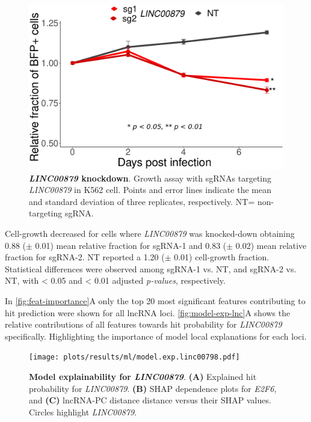 \begin{figure}[ht!]
  \centering
  \includegraphics[scale=0.29]{plots/results/ml/exp.val.results.pdf}
  \caption[\textit{LINC00879} knockdown]{\textbf{\textit{LINC00879} knockdown}. Growth assay with sgRNAs targeting \textit{LINC00879} in K562 cell. Points and error lines indicate the mean and standard deviation of three replicates, respectively. NT= non-targeting sgRNA.}
  \label{fig:linc-kd}
\end{figure}

Cell-growth decreased for cells where \textit{LINC00879} was knocked-down obtaining 0.88 ($\pm$ 0.01) mean relative fraction for sgRNA-1 and 0.83 ($\pm$ 0.02) mean relative fraction  for sgRNA-2. NT reported a 1.20 ($\pm$ 0.01) cell-growth fraction. Statistical differences were observed among sgRNA-1 vs. NT, and sgRNA-2 vs. NT, with < 0.05 and < 0.01 adjusted \textit{p-values}, respectively. 

In \autoref{fig:feat-importance}A only the top 20 most significant features contributing to hit prediction were shown for all lncRNA loci. \autoref{fig:model-exp-lnc}A shows the relative contributions of all features towards hit probability for \textit{LINC00879} specifically. Highlighting the importance of model local explanations for each loci.

\begin{figure}[ht!]
  \centering
  \texttt{[image: plots/results/ml/model.exp.linc00798.pdf]}
  \caption[Model explainability for \textit{LINC00879}]{\textbf{Model explainability for \textit{LINC00879}}. \textbf{(A)} Explained hit probability for \textit{LINC00879}. \textbf{(B)} SHAP dependence plots for \textit{E2F6}, and \textbf{(C)} lncRNA-PC distance distance versus their SHAP values. Circles highlight \textit{LINC00879}.}
  \label{fig:model-exp-lnc}
\end{figure}

